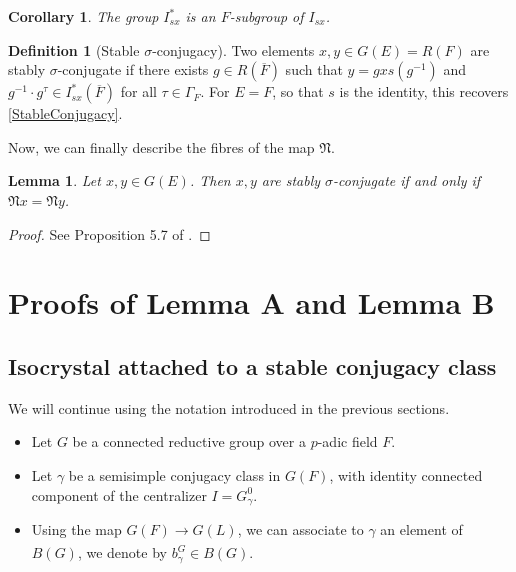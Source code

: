 \documentclass[11pt,a4paper]{article}
\theoremstyle{definition}
\newtheorem{D}[shared]{Definition}
\theoremstyle{plain}
\newtheorem{Le}[shared]{Lemma}
\newtheorem{C}[shared]{Corollary}
\theoremstyle{remark}
\theoremstyle{plain}
\begin{document}
\begin{C}
    The group $I_{sx}^*$ is an $F$-subgroup of $I_{sx}$.
\end{C}

\begin{D}[Stable $\sigma$-conjugacy]
    Two elements $x,y \in G(E) = R(F)$ are stably $\sigma$-conjugate if there exists $g \in R(\overline{F})$ such that $y = gxs(g^{-1})$ and $g^{-1} \cdot g^{\tau} \in I_{sx}^*(\overline{F})$ for all $\tau \in \Gamma_F$. For $E = F$, so that $s$ is the identity, this recovers \ref{StableConjugacy}.
\end{D}

Now, we can finally describe the fibres of the map $\mathfrak{N}$.

\begin{Le}
    Let $x,y \in G(E)$. Then $x,y$ are stably $\sigma$-conjugate if and only if $\mathfrak{N}x = \mathfrak{N}y$.
\end{Le}
\begin{proof}
    See Proposition 5.7 of \cite{MR683003}.
\end{proof}

\section{Proofs of Lemma A and Lemma B}\label{2.4}
\subsection{Isocrystal attached to a stable conjugacy class}
We will continue using the notation introduced in the previous sections.
\begin{itemize}
    \item Let $G$ be a connected reductive group over a $p$-adic field $F$.
    \item Let $\gamma$ be a semisimple conjugacy class in $G(F)$, with identity connected component of the centralizer $I = G_{\gamma}^0$.
    \item Using the map $G(F) \xrightarrow[]{} G(L)$, we can associate to $\gamma$ an element of $B(G)$, we denote by $b_{\gamma}^G \in B(G)$.
\end{itemize}
\end{document}
